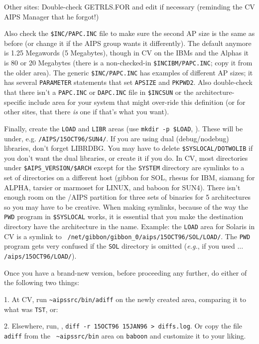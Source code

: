 \noindent Other sites: Double-check {GETRLS.FOR} and edit if necessary
(reminding the CV AIPS Manager that he forgot!)

\noindent Also check the {\tt \$INC/PAPC.INC} file to make sure the
second AP size is the same as before (or change it if the AIPS group
wants it differently).  The default anymore is 1.25 Megawords (5
Megabytes), though in CV on the IBMs and the Alphas it is 80 or 20
Megabytes (there is a non-checked-in {\tt\$INCIBM/PAPC.INC}; copy it
from the older area).  The generic {\tt \$INC/PAPC.INC} has examples of
different AP sizes; it has several {\tt PARAMETER} statements that set
{\tt APSIZE} and {\tt PKPWD2}.  Also double-check that there isn't a
{\tt PAPC.INC} or {\tt DAPC.INC} file in {\tt\$INCSUN} or the
architecture-specific include area for your system that might over-ride
this definition (or for other sites, that there {\it is\/} one if that's
what you want).

Finally, create the {\tt LOAD} and {\tt LIBR} areas (use {\tt mkdir -p
\$LOAD}, \etc).  These will be under, e.g. {\tt /AIPS/15OCT96/SUN4/}.
If you are using dual (debug/nodebug) libraries, don't forget LIBRDBG.
You may have to delete {\tt\$SYSLOCAL/DOTWOLIB} if you don't want the
dual libraries, or create it if you do.  In CV, most directories under
{\tt \$AIPS\_VERSION/\$ARCH} except for the {\tt SYSTEM} directory are
symlinks to a set of directories on a different host (gibbon for SOL,
rhesus for IBM, siamang for ALPHA, tarsier or marmoset for LINUX, and
baboon for SUN4).  There isn't enough room on the /AIPS partition for
three sets of binaries for 5 architectures so you may have to be
creative.  When making symlinks, because of the way the {\tt PWD}
program in {\tt \$SYSLOCAL} works, it is essential that you make the
destination directory have the architecture in the name.  Example: the
{\tt LOAD} area for Solaris in CV is a symlink to {\tt
/net/gibbon/gibbon\_0/aips/15OCT96/SOL/LOAD/}.  The {\tt PWD} program
gets very confused if the {\tt SOL} directory is omitted ({\it e.g.\/},
if you used $\dots${\tt /aips/15OCT96/LOAD/}).

Once you have a brand-new version, before proceeding any further, do
either of the following two things:\medskip

\item{1.} At CV, run {\tt\~{}aipssrc/bin/adiff} on the newly created
	  area, comparing it to what was {\tt TST}, or:
\item{2.} Elsewhere, run, \eg, {\tt diff -r 15OCT96 15JAN96 >
	  diffs.log}.  Or copy the file {\tt adiff} from the {\tt
	  \~{}aipssrc/bin} area on {\tt baboon} and customize it to your
	  liking.

